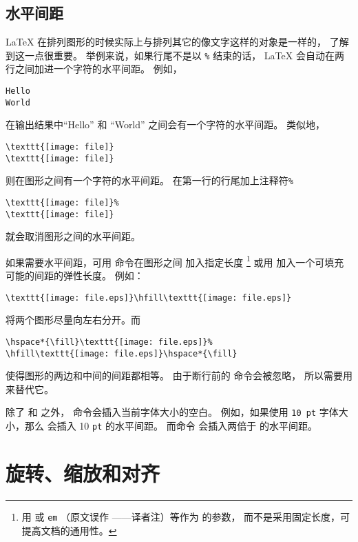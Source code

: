 \subsection{水平间距}\label{ssec:hspace}
\LaTeX{} 在排列图形的时候实际上与排列其它的像文字这样的对象是一样的，
了解到这一点很重要。
举例来说，如果行尾不是以 \texttt{\%} 结束的话，
\LaTeX{} 会自动在两行之间加进一个字符的水平间距。
例如，
\begin{lstlisting}
Hello
World
\end{lstlisting}
在输出结果中``Hello'' 和 ``World'' 之间会有一个字符的水平间距。
类似地，
\begin{lstlisting}
\texttt{[image: file]}
\texttt{[image: file]}
\end{lstlisting}
则在图形之间有一个字符的水平间距。
在第一行的行尾加上注释符\texttt{\%}
\begin{lstlisting}
\texttt{[image: file]}%
\texttt{[image: file]}
\end{lstlisting}
就会取消图形之间的水平间距。

如果需要水平间距，可用  命令在图形之间
加入指定长度
\footnote{
	用  或 \texttt{em} （原文误作 ——译者注）等作为  的参数，
	而不是采用固定长度，可提高文档的通用性。}
或用  加入一个可填充可能的间距的弹性长度。
例如：
\begin{lstlisting}
\texttt{[image: file.eps]}\hfill\texttt{[image: file.eps]}
\end{lstlisting}
将两个图形尽量向左右分开。而
\begin{lstlisting}
\hspace*{\fill}\texttt{[image: file.eps]}%
\hfill\texttt{[image: file.eps]}\hspace*{\fill}
\end{lstlisting}
使得图形的两边和中间的间距都相等。
由于断行前的  命令会被忽略，
所以需要用 来替代它。

除了  和  之外，
 命令会插入当前字体大小的空白。
例如，如果使用 \texttt{10 pt} 字体大小，那么  会插入 10 \texttt{pt} 的水平间距。
而命令  会插入两倍于  的水平间距。




\section{旋转、缩放和对齐}\label{sec:rotate-scale-align}

